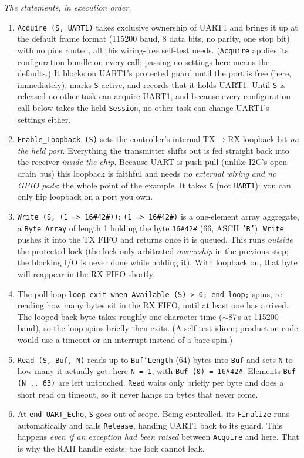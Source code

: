 \emph{The statements, in execution order.}
\begin{enumerate}
\item \texttt{Acquire (S, UART1)} takes exclusive ownership of UART1 and brings it
  up at the default frame format (115200 baud, 8 data bits, no parity, one stop
  bit) with no pins routed, all this wiring-free self-test needs. (\texttt{Acquire}
  applies its configuration bundle on every call; passing no settings here means
  the defaults.) It blocks on UART1's protected guard until the port is free
  (here, immediately), marks \texttt{S} active, and records that it holds UART1.
  Until \texttt{S} is released no other task can acquire UART1, and because every
  configuration call below takes the held \texttt{Session}, no other task can
  change UART1's settings either.
\item \texttt{Enable\_Loopback (S)} sets the controller's internal TX$\rightarrow$RX
  loopback bit \emph{on the held port}. Everything the transmitter shifts out is
  fed straight back into the receiver \emph{inside the chip}. Because UART is
  push-pull (unlike I2C's open-drain bus) this loopback is faithful and needs
  \emph{no external wiring and no GPIO pads}: the whole point of the example.
  It takes \texttt{S} (not \texttt{UART1}): you can only flip loopback on a port
  you own.
\item \texttt{Write (S, (1 => 16\#42\#))}: \texttt{(1 => 16\#42\#)} is a
  one-element array aggregate, a \texttt{Byte\_Array} of length 1 holding the
  byte \texttt{16\#42\#} (66, ASCII \texttt{'B'}). \texttt{Write} pushes it into
  the TX FIFO and returns once it is queued. This runs \emph{outside} the
  protected lock (the lock only arbitrated \emph{ownership} in the previous
  step; the blocking I/O is never done while holding it). With loopback on, that
  byte will reappear in the RX FIFO shortly.
\item The poll loop \texttt{loop exit when Available (S) > 0; end loop;} spins,
  re-reading how many bytes sit in the RX FIFO, until at least one has arrived.
  The looped-back byte takes roughly one character-time ($\sim$87\,\textmu s at
  115200 baud), so the loop spins briefly then exits. (A self-test idiom;
  production code would use a timeout or an interrupt instead of a bare spin.)
\item \texttt{Read (S, Buf, N)} reads up to \texttt{Buf'Length} (64) bytes into
  \texttt{Buf} and sets \texttt{N} to how many it actually got: here
  \texttt{N = 1}, with \texttt{Buf (0) = 16\#42\#}. Elements
  \texttt{Buf (N .. 63)} are left untouched. \texttt{Read} waits only briefly
  per byte and does a short read on timeout, so it never hangs on bytes that
  never come.
\item At \texttt{end UART\_Echo}, \texttt{S} goes out of scope. Being controlled,
  its \texttt{Finalize} runs automatically and calls \texttt{Release}, handing
  UART1 back to its guard. This happens \emph{even if an exception had been
  raised} between \texttt{Acquire} and here. That is why the RAII handle
  exists: the lock cannot leak.
\end{enumerate}

